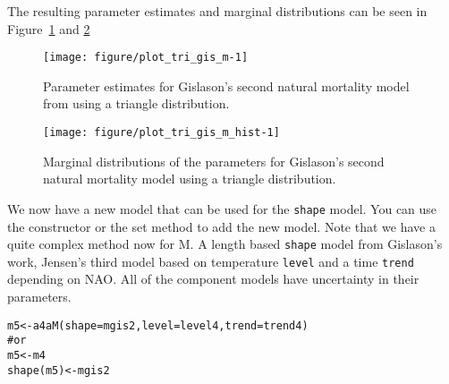 \documentclass[a4paper,english,10pt]{article}\usepackage[]{graphicx}\usepackage[]{color}
\makeatletter
\def\maxwidth{ %
  \ifdim\Gin@nat@width>\linewidth
    \linewidth
  \else
    \Gin@nat@width
  \fi
}
\newcommand{\hlcom}[1]{\textcolor[rgb]{0.2,0.267,0.4}{#1}}%
\newcommand{\hlstd}[1]{\textcolor[rgb]{0,0,0}{#1}}%
\newcommand{\hlkwb}[1]{\textcolor[rgb]{0.361,0.506,0.596}{#1}}%
\newcommand{\hlkwc}[1]{\textcolor[rgb]{0.361,0.506,0.596}{#1}}%
\newcommand{\hlkwd}[1]{\textcolor[rgb]{0.361,0.506,0.596}{#1}}%
\newenvironment{kframe}{%
 \def\at@end@of@kframe{}%
 \ifinner\ifhmode%
  \def\at@end@of@kframe{\end{minipage}}%
  \begin{minipage}{\columnwidth}%
 \fi\fi%
 \def\FrameCommand##1{\hskip\@totalleftmargin \hskip-\fboxsep
 \colorbox{shadecolor}{##1}\hskip-\fboxsep
     \hskip-\linewidth \hskip-\@totalleftmargin \hskip\columnwidth}%
 \MakeFramed {\advance\hsize-\width
   \@totalleftmargin\z@ \linewidth\hsize
   \@setminipage}}%
 {\par\unskip\endMakeFramed%
 \at@end@of@kframe}
\newenvironment{knitrout}{}{} %
\newcommand{\code}[1]{{\texttt{#1}}}
\makeatother
\begin{document}
The resulting parameter estimates and marginal distributions can be seen in Figure~\ref{fig:plot_tri_gis_m} and \ref{fig:plot_tri_gis_m_hist}

\begin{knitrout}
\color{fgcolor}\begin{figure}[H]

{\centering \texttt{[image: figure/plot\_tri\_gis\_m-1]} 

}

\caption[Parameter estimates for Gislason's second natural mortality model from using a triangle distribution]{Parameter estimates for Gislason's second natural mortality model from using a triangle distribution.}\label{fig:plot_tri_gis_m}
\end{figure}


\end{knitrout}

\begin{knitrout}
\color{fgcolor}\begin{figure}[H]

{\centering \texttt{[image: figure/plot\_tri\_gis\_m\_hist-1]} 

}

\caption[Marginal distributions of the parameters for Gislason's second natural mortality model using a triangle distribution]{Marginal distributions of the parameters for Gislason's second natural mortality model using a triangle distribution.}\label{fig:plot_tri_gis_m_hist}
\end{figure}


\end{knitrout}

We now have a new model that can be used for the \code{shape} model. You can use the constructor or the set method to add the new model. Note that we have a quite complex method now for M. A length based \code{shape} model from Gislason's work, Jensen's third model based on temperature \code{level} and a time \code{trend} depending on NAO. All of the component models have uncertainty in their parameters.

\begin{knitrout}
\color{fgcolor}\begin{kframe}
\begin{alltt}
\hlstd{m5} \hlkwb{<-} \hlkwd{a4aM}\hlstd{(}\hlkwc{shape}\hlstd{=mgis2,} \hlkwc{level}\hlstd{=level4,} \hlkwc{trend}\hlstd{=trend4)}
\hlcom{# or}
\hlstd{m5} \hlkwb{<-} \hlstd{m4}
\hlkwd{shape}\hlstd{(m5)} \hlkwb{<-} \hlstd{mgis2}
\end{alltt}
\end{kframe}
\end{knitrout}
\end{document}

